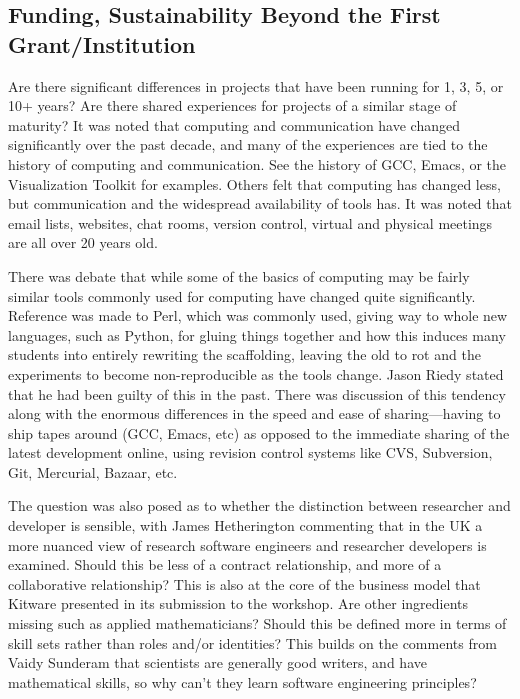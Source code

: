 \documentclass[11pt, oneside]{amsart}
\begin{document}
\subsection{Funding, Sustainability Beyond the First Grant/Institution}

Are there significant differences in projects that have been running for 1, 3,
5, or 10+ years? Are there shared experiences for projects of a similar stage
of maturity? It was noted that computing and communication have changed
significantly over the past decade, and many of the experiences are tied to
the history of computing and communication. See the history of GCC, Emacs, or
the Visualization Toolkit for examples. Others felt that computing has changed
less, but communication and the widespread availability of tools has. It was
noted that email lists, websites, chat rooms, version control, virtual and
physical meetings are all over 20 years old.

There was debate that while some of the basics of computing may be fairly
similar tools commonly used for computing have changed quite
significantly. Reference was made to Perl, which was commonly used, giving way
to whole new languages, such as Python, for gluing things together and how this
induces many students into entirely rewriting the scaffolding, leaving the old
to rot and the experiments to become non-reproducible as the tools change.
Jason Riedy stated that he had been guilty of this in the past. There was
discussion of this tendency along with the enormous differences in the speed and
ease of sharing---having to ship tapes around (GCC, Emacs, etc) as opposed to
the immediate sharing of the latest development online, using revision control
systems like CVS, Subversion, Git, Mercurial, Bazaar, etc.

The question was also posed as to whether the distinction between researcher
and developer is sensible, with James Hetherington commenting that in the UK
a more nuanced view of research software engineers
and researcher developers is examined. Should this be less of a contract relationship, and
more of a collaborative relationship? This is also at the core of the business
model that Kitware presented in its submission to the workshop. Are other
ingredients missing such as applied mathematicians? Should this be defined more
in terms of skill sets rather than roles and/or identities? This builds on the
comments from Vaidy Sunderam that scientists are generally good writers, and
have mathematical skills, so why can't they learn software engineering
principles?
\end{document}
